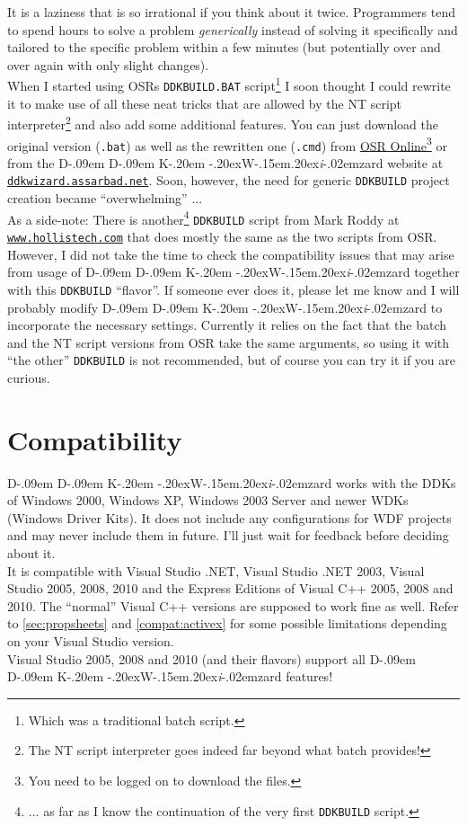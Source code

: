 \documentclass[a4paper,titlepage]{report}
\newcommand{\linkclr}[1]{\textcolor[rgb]{0.00,0.00,0.60}{#1}}
\newcommand{\extlink}[2]{\href{#1}{\linkclr{#2}}}
\newcommand{\extlinktt}[2]{\href{#1}{\texttt{\linkclr{#2}}}}
\def\ddkwiz{D\kern-.09em D\kern-.09em K\kern-.20em \raise-.20ex\hbox{W}\kern-.15em\raise.20ex\hbox{\it{i}}\kern-.02em{zard}}
\begin{document}
It is a laziness that is so irrational if you think about it twice.
Programmers tend to spend hours to solve a problem \emph{generically}\texttrademark{}
instead of solving it specifically and tailored to the specific problem within a few
minutes (but potentially over and over again with only slight changes).\\

When I started using OSRs \texttt{DDKBUILD.BAT} script\footnote{Which was a traditional batch script.}
I soon thought I could rewrite it to make use of all these neat tricks
that are allowed by the NT script interpreter\footnote{The NT script interpreter
goes indeed far beyond what batch provides!} and also add some additional features.
You can just download the original version (\texttt{.bat}) as well as the rewritten
one (\texttt{.cmd}) from \extlink{http://www.osronline.com/article.cfm?article=43}{OSR
Online}\footnote{You need to be logged on to download the files.}
or from the \ddkwiz{} website at \extlinktt{http://ddkwizard.assarbad.net}{ddkwizard.assarbad.net}.
Soon, however, the need for generic \texttt{DDKBUILD} project creation became ``overwhelming'' ...\\

As a side-note: There is another\footnote{... as far as I know the continuation of
the very first \texttt{DDKBUILD} script.} \texttt{DDKBUILD} script from Mark Roddy at
\extlinktt{http://www.hollistech.com}{www.hollistech.com}
that does mostly the same as the two scripts from OSR. However, I did not take the time
to check the compatibility issues that may arise from usage of \ddkwiz{} together
with this \texttt{DDKBUILD} ``flavor''. If someone ever does it, please let me know
and I will probably modify \ddkwiz{} to incorporate the necessary
settings. Currently it relies on the fact that the batch and the NT script
versions from OSR take the same arguments, so using it with ``the other''
\texttt{DDKBUILD} is not recommended, but of course you can try it if you are curious.

\section*{Compatibility}
\ddkwiz{} works with the DDKs of
Windows 2000, Windows XP, Windows 2003 Server and newer WDKs (Windows Driver Kits).
It does not include any configurations for WDF projects and may never include
them in future. I'll just wait for feedback before deciding about it.\\
It is compatible with Visual Studio .NET, Visual Studio .NET 2003, Visual Studio 2005,
2008, 2010 and the Express Editions of Visual C++ 2005, 2008 and 2010. The ``normal''
Visual C++ versions are supposed to work fine as well. Refer to \autoref{sec:propsheets}
and \autoref{compat:activex} for some possible limitations depending
on your Visual Studio version.\\
Visual Studio 2005, 2008 and 2010 (and their flavors) support all \ddkwiz{} features!
\end{document}
